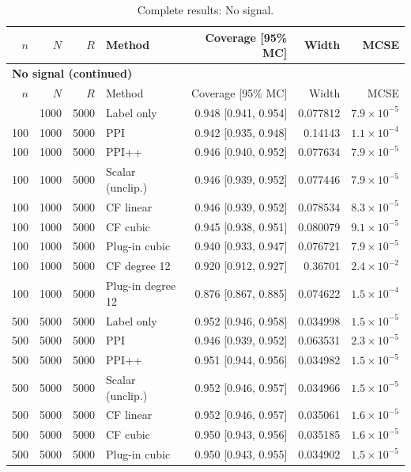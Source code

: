 {\setlength{\tabcolsep}{3pt}\begin{longtable}{rrrlrrr}
\caption{Complete results: No signal.}\\
\toprule $n$ & $N$ & $R$ & Method & Coverage [95\% MC] & Width & MCSE \\
\midrule\endfirsthead
\multicolumn{7}{l}{\textbf{No signal (continued)}}\\
\toprule $n$ & $N$ & $R$ & Method & Coverage [95\% MC] & Width & MCSE \\
\midrule\endhead
\bottomrule\endfoot
100 & 1000 & 5000 & Label only & 0.948 [0.941, 0.954] & 0.077812 & $7.9\times 10^{-5}$ \\
100 & 1000 & 5000 & PPI & 0.942 [0.935, 0.948] & 0.14143 & $1.1\times 10^{-4}$ \\
100 & 1000 & 5000 & PPI++ & 0.946 [0.940, 0.952] & 0.077634 & $7.9\times 10^{-5}$ \\
100 & 1000 & 5000 & Scalar (unclip.) & 0.946 [0.939, 0.952] & 0.077446 & $7.9\times 10^{-5}$ \\
100 & 1000 & 5000 & CF linear & 0.946 [0.939, 0.952] & 0.078534 & $8.3\times 10^{-5}$ \\
100 & 1000 & 5000 & CF cubic & 0.945 [0.938, 0.951] & 0.080079 & $9.1\times 10^{-5}$ \\
100 & 1000 & 5000 & Plug-in cubic & 0.940 [0.933, 0.947] & 0.076721 & $7.9\times 10^{-5}$ \\
100 & 1000 & 5000 & CF degree 12 & 0.920 [0.912, 0.927] & 0.36701 & $2.4\times 10^{-2}$ \\
100 & 1000 & 5000 & Plug-in degree 12 & 0.876 [0.867, 0.885] & 0.074622 & $1.5\times 10^{-4}$ \\
500 & 5000 & 5000 & Label only & 0.952 [0.946, 0.958] & 0.034998 & $1.5\times 10^{-5}$ \\
500 & 5000 & 5000 & PPI & 0.946 [0.939, 0.952] & 0.063531 & $2.3\times 10^{-5}$ \\
500 & 5000 & 5000 & PPI++ & 0.951 [0.944, 0.956] & 0.034982 & $1.5\times 10^{-5}$ \\
500 & 5000 & 5000 & Scalar (unclip.) & 0.952 [0.946, 0.957] & 0.034966 & $1.5\times 10^{-5}$ \\
500 & 5000 & 5000 & CF linear & 0.952 [0.946, 0.957] & 0.035061 & $1.6\times 10^{-5}$ \\
500 & 5000 & 5000 & CF cubic & 0.950 [0.943, 0.956] & 0.035185 & $1.6\times 10^{-5}$ \\
500 & 5000 & 5000 & Plug-in cubic & 0.950 [0.943, 0.955] & 0.034902 & $1.5\times 10^{-5}$ \\

\end{longtable}}
